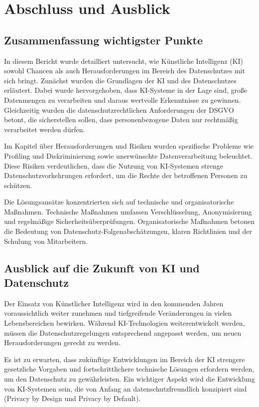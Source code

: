 \chapter{Abschluss und Ausblick}

\section{Zusammenfassung wichtigster Punkte}
In diesem Bericht wurde detailliert untersucht, wie Künstliche Intelligenz (KI)
sowohl Chancen als auch Herausforderungen im Bereich des Datenschutzes mit sich
bringt. Zunächst wurden die Grundlagen der KI und des Datenschutzes erläutert.
Dabei wurde hervorgehoben, dass KI-Systeme in der Lage sind, große Datenmengen
zu verarbeiten und daraus wertvolle Erkenntnisse zu gewinnen. Gleichzeitig
wurden die datenschutzrechtlichen Anforderungen der DSGVO betont, die
sicherstellen sollen, dass personenbezogene Daten nur rechtmäßig verarbeitet
werden dürfen.

Im Kapitel über Herausforderungen und Risiken wurden spezifische Probleme wie
Profiling und Diskriminierung sowie unerwünschte Datenverarbeitung beleuchtet.
Diese Risiken verdeutlichen, dass die Nutzung von KI-Systemen strenge
Datenschutzvorkehrungen erfordert, um die Rechte der betroffenen Personen zu
schützen.

Die Lösungsansätze konzentrierten sich auf technische und organisatorische
Maßnahmen. Technische Maßnahmen umfassen Verschlüsselung, Anonymisierung und
regelmäßige Sicherheitsüberprüfungen. Organisatorische Maßnahmen betonen die
Bedeutung von Datenschutz-Folgenabschätzungen, klaren Richtlinien und der
Schulung von Mitarbeitern.

\section{Ausblick auf die Zukunft von KI und Datenschutz}
Der Einsatz von Künstlicher Intelligenz wird in den kommenden Jahren
voraussichtlich weiter zunehmen und tiefgreifende Veränderungen in vielen
Lebensbereichen bewirken. Während KI-Technologien weiterentwickelt werden,
müssen die Datenschutzregelungen entsprechend angepasst werden, um neuen
Herausforderungen gerecht zu werden.

Es ist zu erwarten, dass zukünftige Entwicklungen im Bereich der KI strengere
gesetzliche Vorgaben und fortschrittlichere technische Lösungen erfordern
werden, um den Datenschutz zu gewährleisten. Ein wichtiger Aspekt wird die
Entwicklung von KI-Systemen sein, die von Anfang an datenschutzfreundlich
konzipiert sind (Privacy by Design und Privacy by Default).

